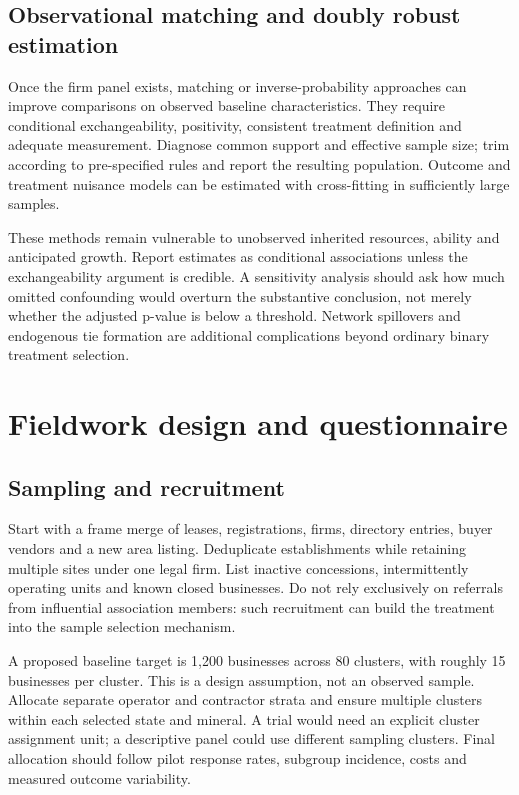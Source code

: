 \documentclass[11pt,a4paper]{report}
\begin{document}
\section{Observational matching and doubly robust estimation}
Once the firm panel exists, matching or inverse-probability approaches can improve comparisons on observed baseline characteristics. They require conditional exchangeability, positivity, consistent treatment definition and adequate measurement. Diagnose common support and effective sample size; trim according to pre-specified rules and report the resulting population. Outcome and treatment nuisance models can be estimated with cross-fitting in sufficiently large samples.

These methods remain vulnerable to unobserved inherited resources, ability and anticipated growth. Report estimates as conditional associations unless the exchangeability argument is credible. A sensitivity analysis should ask how much omitted confounding would overturn the substantive conclusion, not merely whether the adjusted p-value is below a threshold. Network spillovers and endogenous tie formation are additional complications beyond ordinary binary treatment selection.

\chapter{Fieldwork design and questionnaire}
\section{Sampling and recruitment}
Start with a frame merge of leases, registrations, firms, directory entries, buyer vendors and a new area listing. Deduplicate establishments while retaining multiple sites under one legal firm. List inactive concessions, intermittently operating units and known closed businesses. Do not rely exclusively on referrals from influential association members: such recruitment can build the treatment into the sample selection mechanism.

A proposed baseline target is 1,200 businesses across 80 clusters, with roughly 15 businesses per cluster. This is a design assumption, not an observed sample. Allocate separate operator and contractor strata and ensure multiple clusters within each selected state and mineral. A trial would need an explicit cluster assignment unit; a descriptive panel could use different sampling clusters. Final allocation should follow pilot response rates, subgroup incidence, costs and measured outcome variability.
\end{document}
